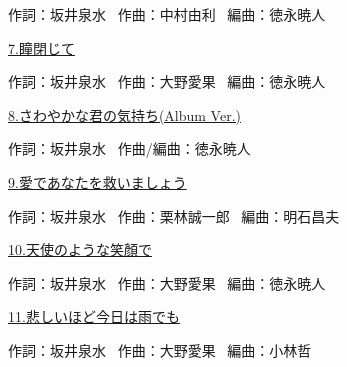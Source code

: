 \tiny{作詞：坂井泉水 \ 作曲：中村由利 \ 編曲：徳永暁人}

\small{\hyperlink{10_6}{7.瞳閉じて}}

\tiny{作詞：坂井泉水 \ 作曲：大野愛果 \ 編曲：徳永暁人}

\small{\hyperlink{10_7}{8.さわやかな君の気持ち(Album Ver.)}}

\tiny{作詞：坂井泉水 \ 作曲/編曲：徳永暁人}

\small{\hyperlink{10_8}{9.愛であなたを救いましょう}}

\tiny{作詞：坂井泉水 \ 作曲：栗林誠一郎 \ 編曲：明石昌夫}

\small{\hyperlink{10_9}{10.天使のような笑顏で}}

\tiny{作詞：坂井泉水 \ 作曲：大野愛果 \ 編曲：徳永暁人}

\small{\hyperlink{10_10}{11.悲しいほど今日は雨でも}}

\tiny{作詞：坂井泉水 \ 作曲：大野愛果 \ 編曲：小林哲}

\small{ \ }

\tiny{ \ }

\small{ \ }

\tiny{ \ }

\clearpage

